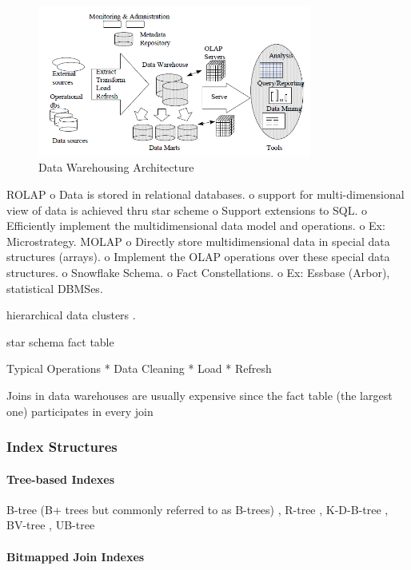 \documentclass[12pt,a4paper]{article}
\begin{document}
\begin{figure}[!t]
\centering
\includegraphics[width=9cm]{figs/dw.png}
\caption{Data Warehousing Architecture \cite{chaudhuri1997overview}}
\label{fig:dw}
\end{figure}


\cite{Cheung20011}
ROLAP
          o Data is stored in relational databases.
          o support for multi-dimensional view of data is achieved thru star scheme
          o Support extensions to SQL.
          o Efficiently implement the multidimensional data model and operations.
          o Ex: Microstrategy.
MOLAP
          o Directly store multidimensional data in special data structures (arrays).
          o Implement the OLAP operations over these special data structures.
          o Snowflake Schema. \cite{kimball2009data}
          o Fact Constellations.
          o Ex: Essbase (Arbor), statistical DBMSes.

hierarchical data clusters \cite{karayannidis2008hierarchical}.

star schema
fact table

Typical Operations
    * Data Cleaning
    * Load
    * Refresh

Joins in data warehouses are usually expensive since the fact table (the largest one) participates in every join \cite{628286}

\subsubsection{Index Structures}
\paragraph{Tree-based Indexes}
B-tree (B+ trees but commonly referred to as B-trees) \cite{253268}, R-tree \cite{602266, Cheung20011}, K-D-B-tree \cite{582321}, BV-tree \cite{223796}, UB-tree
\cite{bayer1997universal}


\paragraph{Bitmapped Join Indexes}
\cite{212001}
\end{document}
